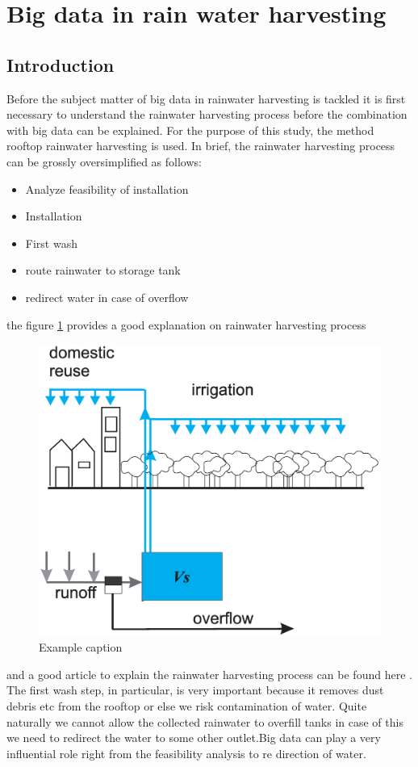 \documentclass[sigconf]{acmart}
\begin{document}
\section{Big data in rain water harvesting}

\subsection{Introduction}
Before the subject matter of big data in rainwater harvesting is tackled it is first necessary to understand the rainwater harvesting process before the combination with big data can be explained. For the purpose of this study, the method rooftop rainwater harvesting is used. In brief, the rainwater harvesting process can be grossly oversimplified as follows:
\begin{itemize}
  \item Analyze feasibility of installation
  \item Installation
  \item First wash
  \item route rainwater to storage tank
  \item redirect water in case of overflow
\end{itemize}
the figure \ref{f:water} provides a good explanation on rainwater harvesting process
\begin{figure}[!ht]
  \centering\includegraphics[width=\columnwidth]{images/water.pdf}
  \caption{Example caption}\label{f:water}
\end{figure} 
and a good article to explain the rainwater harvesting process can be found here \cite{Wikipedia2016}. The first wash step, in particular, is very important because it removes dust debris etc from the rooftop or else we risk contamination of water. Quite naturally we cannot allow the collected rainwater to overfill tanks in case of this we need to redirect the water to some other outlet.Big data can play a very influential role right from the feasibility analysis to re direction of water.
\end{document}
